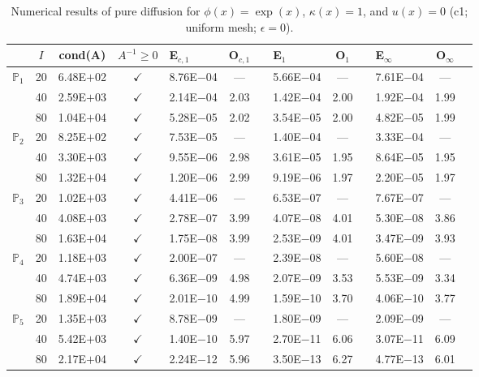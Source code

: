 \begin{table}[H]
\centering
\caption{Numerical results of pure diffusion for $\phi(x)=\exp(x)$, $\kappa(x)=1$, and $u(x)=0$ (c1; uniform mesh; $\epsilon=0$).}
\begin{tabular}{@{}l c c c l c c l c c l c c@{}}
\toprule
 & $I$ & cond(A) & $A^{-1}\geq 0$ &  E$_{c,1}$ & O$_{c,1}$ && E$_1$ & O$_1$ && E$_{\infty}$ & O$_{\infty}$\\
\midrule
\multirow{3}{*}{$\mathbb{P}_{1}$}
 & 20 & 6.48E$+$02 & $\checkmark$ & 8.76E$-$04 & --- && 5.66E$-$04 & --- && 7.61E$-$04 & ---\\
 & 40 & 2.59E$+$03 & $\checkmark$ & 2.14E$-$04 & 2.03 && 1.42E$-$04 & 2.00 && 1.92E$-$04 & 1.99\\
 & 80 & 1.04E$+$04 & $\checkmark$ & 5.28E$-$05 & 2.02 && 3.54E$-$05 & 2.00 && 4.82E$-$05 & 1.99\\
\midrule
\multirow{3}{*}{$\mathbb{P}_{2}$}
 & 20 & 8.25E$+$02 & $\checkmark$ & 7.53E$-$05 & --- && 1.40E$-$04 & --- && 3.33E$-$04 & ---\\
 & 40 & 3.30E$+$03 & $\checkmark$ & 9.55E$-$06 & 2.98 && 3.61E$-$05 & 1.95 && 8.64E$-$05 & 1.95\\
 & 80 & 1.32E$+$04 & $\checkmark$ & 1.20E$-$06 & 2.99 && 9.19E$-$06 & 1.97 && 2.20E$-$05 & 1.97\\
\midrule
\multirow{3}{*}{$\mathbb{P}_{3}$}
 & 20 & 1.02E$+$03 & $\checkmark$ & 4.41E$-$06 & --- && 6.53E$-$07 & --- && 7.67E$-$07 & ---\\
 & 40 & 4.08E$+$03 & $\checkmark$ & 2.78E$-$07 & 3.99 && 4.07E$-$08 & 4.01 && 5.30E$-$08 & 3.86\\
 & 80 & 1.63E$+$04 & $\checkmark$ & 1.75E$-$08 & 3.99 && 2.53E$-$09 & 4.01 && 3.47E$-$09 & 3.93\\
\midrule
\multirow{3}{*}{$\mathbb{P}_{4}$}
 & 20 & 1.18E$+$03 & $\checkmark$ & 2.00E$-$07 & --- && 2.39E$-$08 & --- && 5.60E$-$08 & ---\\
 & 40 & 4.74E$+$03 & $\checkmark$ & 6.36E$-$09 & 4.98 && 2.07E$-$09 & 3.53 && 5.53E$-$09 & 3.34\\
 & 80 & 1.89E$+$04 & $\checkmark$ & 2.01E$-$10 & 4.99 && 1.59E$-$10 & 3.70 && 4.06E$-$10 & 3.77\\
\midrule
\multirow{3}{*}{$\mathbb{P}_{5}$}
 & 20 & 1.35E$+$03 & $\checkmark$ & 8.78E$-$09 & --- && 1.80E$-$09 & --- && 2.09E$-$09 & ---\\
 & 40 & 5.42E$+$03 & $\checkmark$ & 1.40E$-$10 & 5.97 && 2.70E$-$11 & 6.06 && 3.07E$-$11 & 6.09\\
 & 80 & 2.17E$+$04 & $\checkmark$ & 2.24E$-$12 & 5.96 && 3.50E$-$13 & 6.27 && 4.77E$-$13 & 6.01\\
\bottomrule
\end{tabular}
\end{table}